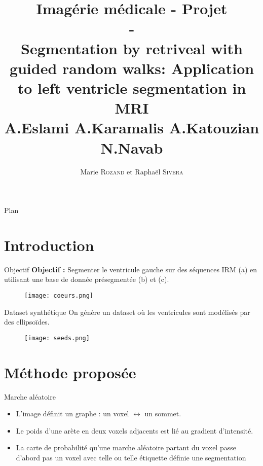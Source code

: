 \documentclass{beamer}
\title{Imagérie médicale - Projet \\ - \\ \small{Segmentation by retriveal with guided random walks: Application to left ventricle segmentation in MRI \\ A.Eslami A.Karamalis A.Katouzian N.Navab}}
\author{Marie \textsc{Rozand} et Raphaël \textsc{Sivera}}
\begin{document}
\begin{frame}
  \begin{center}

    \titlepage

  \end{center}
\end{frame}


\begin{frame}{Plan}
  \tableofcontents
\end{frame}



\section{Introduction}
\begin{frame}{Objectif}
  \textbf{Objectif : }Segmenter le ventricule gauche sur des séquences IRM (a) en utilisant une base de donnée présegmentée (b) et (c).
  \begin{figure}[h]
    \begin{center}
      \texttt{[image: coeurs.png]}
    \end{center}
  \end{figure}
\end{frame}


\begin{frame}{Dataset synthétique}
On génère un dataset où les ventricules sont modélisés par des ellipsoïdes. 
\begin{figure}[h]
  \begin{center}
    \texttt{[image: seeds.png]}
  \end{center}
\end{figure}
\end{frame}


\section{Méthode proposée}
\begin{frame}{Marche aléatoire}
  \begin{itemize}
  \item L'image définit un graphe : un voxel $\leftrightarrow$ un sommet.
  \item Le poids d'une arète en deux voxels adjacents est lié au gradient d'intensité.
  \item La carte de probabilité qu'une marche aléatoire partant du voxel passe d'abord pas un voxel avec telle ou telle étiquette définie une segmentation
  \end{itemize}
\end{frame}
\end{document}
